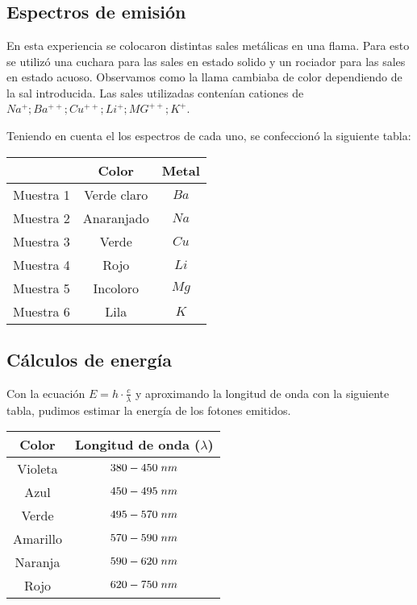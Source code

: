 \documentclass[12pt]{report}
\begin{document}
\chapter{}
\section{Espectros de emisión}
En esta experiencia se colocaron distintas sales metálicas en una flama.
Para esto se utilizó una cuchara para las sales en estado solido y un rociador para las sales en 
estado acuoso.
Observamos como la llama cambiaba de color dependiendo de la sal introducida.
Las sales utilizadas contenían cationes de $Na^{+} ; Ba^{++} ; Cu^{++} ; Li^{+} ; MG^{++} ; K^{+}$.

Teniendo en cuenta el los espectros de cada uno, se confeccionó la siguiente tabla:

\begin{table}[h!]
\centering
\begin{tabular}{|c|c|c|}
  \hline
  \textbf{} & \textbf{Color} & \textbf{Metal} \\
  \hline
  Muestra 1 & Verde claro & $Ba$ \\
  \hline
  Muestra 2 & Anaranjado & $Na$\\
  \hline
  Muestra 3 & Verde & $Cu$ \\
  \hline
  Muestra 4 & Rojo & $Li$\\
  \hline
  Muestra 5 & Incoloro & $Mg$\\
  \hline
  Muestra 6 & Lila & $K$ \\
  \hline
\end{tabular}
\label{tab:colores_metales}
\end{table}

\section{Cálculos de energía}
Con la ecuación $E=h\cdot\frac{c}{\lambda}$ y aproximando la longitud de onda con la siguiente
tabla, pudimos estimar la energía de los fotones emitidos.

\begin{table}[h!]
  \centering
  \begin{tabular}{|c|c|}
    \hline
    Color & Longitud de onda ($\lambda$)\\
    \hline
    Violeta & $380-450\hspace{1mm}nm$ \\
    \hline
    Azul & $450-495\hspace{1mm} nm$ \\
    \hline
    Verde & $495-570\hspace{1mm} nm$ \\
    \hline
    Amarillo & $570-590\hspace{1mm} nm$ \\
    \hline
    Naranja & $590-620\hspace{1mm} nm$ \\
    \hline
    Rojo & $620-750\hspace{1mm} nm$ \\
    \hline
  \end{tabular}
\end{table}
\end{document}
